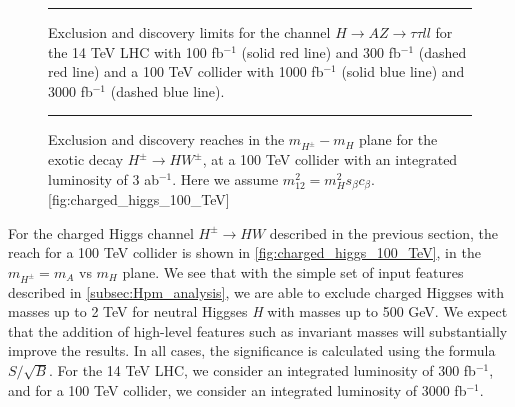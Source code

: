 {\begin{figure}
{\color{gray}\hrule}\vspace{\onelineskip}
  \caption{Exclusion and discovery limits for the channel $H\rightarrow AZ\rightarrow \tau\tau ll$ for the 14 TeV LHC with 100 fb$^{-1}$ (solid red line) and 300 fb$^{-1}$ (dashed red line) and a 100 TeV collider with 1000 fb$^{-1}$ (solid blue line) and 3000 fb$^{-1}$ (dashed blue line). }
  \vspace{\onelineskip}{\color{gray}\hrule}
\label{fig:Honglei_H_tatall}
\end{figure}

\begin{figure}
{\color{gray}\hrule}\vspace{\onelineskip}
  \begin{sidecaption}{Exclusion and discovery reaches in the $m_{H^\pm}-m_{H}$ plane for the exotic decay $H^\pm\rightarrow HW^\pm$, at a 100 TeV collider with an integrated luminosity of 3 ab$^{-1}$. Here we assume $m_{12}^2 = m_H^2s_\beta c_\beta$.}[fig:charged_higgs_100_TeV]
    
  \end{sidecaption}
\vspace{\onelineskip}{\color{gray}\hrule}
\end{figure}

For the charged Higgs channel $H^\pm\rightarrow HW$ described in the previous section, the reach for a 100 TeV collider is shown in \autoref{fig:charged_higgs_100_TeV}, in the $m_{H^\pm} = m_A$ vs $m_H$ plane. We see that with the simple set of input features described in \autoref{subsec:Hpm_analysis}, we are able to exclude charged Higgses with masses up to 2 TeV for neutral Higgses \emph{H} with masses up to 500 GeV. We expect that the addition of high-level features such as invariant masses will substantially improve the results. In all cases, the significance is calculated using the formula $S/\sqrt{B}$. For the 14 TeV LHC, we consider an integrated luminosity of 300 fb$^{-1}$, and for a 100 TeV collider, we consider an integrated luminosity of 3000 fb$^{-1}$.

}
